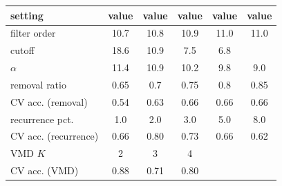 \begin{tabular}{lccccc}
\toprule
setting & value & value & value & value & value \\
\midrule
filter order & 10.7 & 10.8 & 10.9 & 11.0 & 11.0 \\
cutoff & 18.6 & 10.9 & 7.5 & 6.8 &  \\
$\alpha$ & 11.4 & 10.9 & 10.2 & 9.8 & 9.0 \\
\midrule
removal ratio & 0.65 & 0.7 & 0.75 & 0.8 & 0.85 \\
\midrule
CV acc. (removal) & 0.54 & 0.63 & 0.66 & 0.66 & 0.66 \\
\midrule
recurrence pct. & 1.0 & 2.0 & 3.0 & 5.0 & 8.0 \\
CV acc. (recurrence) & 0.66 & 0.80 & 0.73 & 0.66 & 0.62 \\
\midrule
VMD $K$ & 2 & 3 & 4 &  &  \\
CV acc. (VMD) & 0.88 & 0.71 & 0.80 &  &  \\
\bottomrule
\end{tabular}
